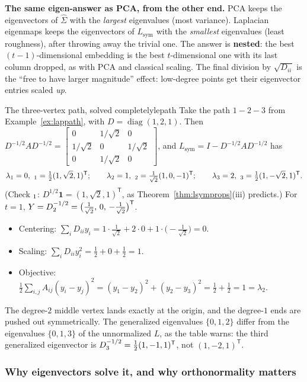 \documentclass[11pt]{article}
\newcommand{\bm}[1]{\symbfit{#1}}
\let\vv\relax\newcommand{\vv}{\bm{v}}
\newcommand{\one}{\symbf{1}}
\newcommand{\Sig}{\widehat{\Sigma}}
\newcommand{\T}{^{\mathsf T}}
\newcommand{\diag}{\operatorname{diag}}
\begin{document}
\begin{intuition}
\textbf{The same eigen-answer as PCA, from the other end.} PCA keeps the eigenvectors of $\Sig$ with the \emph{largest} eigenvalues (most variance). Laplacian eigenmaps keeps the eigenvectors of $L_{\mathrm{sym}}$
with the \emph{smallest} eigenvalues (least roughness), after throwing away the trivial one. The answer is \textbf{nested}: the best
$(t-1)$-dimensional embedding is the best $t$-dimensional one with its last column dropped, as with PCA and classical scaling. The final
division by $\sqrt{D_{ii}}$ is the ``free to have larger magnitude'' effect: low-degree points get their eigenvector entries scaled \emph{up}.
\end{intuition}

\begin{example}{The three-vertex path, solved completely}{lepath}
Take the path $1-2-3$ from Example~\ref{ex:lappath}, with $D=\diag(1,2,1)$. Then $D^{-1/2}AD^{-1/2}=\begin{bmatrix}0&1/\sqrt2&0\\1/\sqrt2&0&1/\sqrt2\\0&1/\sqrt2&0\end{bmatrix}$,
and $L_{\mathrm{sym}}=I-D^{-1/2}AD^{-1/2}$ has
\[
\lambda_1=0,\ \vv_1=\tfrac12(1,\sqrt2,1)\T;\qquad \lambda_2=1,\ \vv_2=\tfrac1{\sqrt2}(1,0,-1)\T;\qquad \lambda_3=2,\ \vv_3=\tfrac12(1,-\sqrt2,1)\T .
\]
(Check $\vv_1$: $D^{1/2}\one=(1,\sqrt2,1)\T$, as Theorem~\ref{thm:lsymprops}(iii) predicts.) For $t=1$, $Y=D^{-1/2}\vv_2=\big(\tfrac1{\sqrt2},\,0,\,-\tfrac1{\sqrt2}\big)\T$.
\begin{itemize}[nosep]
\item Centering: $\sum_iD_{ii}y_i=1\cdot\tfrac1{\sqrt2}+2\cdot0+1\cdot\big(-\tfrac1{\sqrt2}\big)=0$. \checkmark
\item Scaling: $\sum_iD_{ii}y_i^2=\tfrac12+0+\tfrac12=1$. \checkmark
\item Objective: $\tfrac12\sum_{i,j}A_{ij}(y_i-y_j)^2=(y_1-y_2)^2+(y_2-y_3)^2=\tfrac12+\tfrac12=1=\lambda_2$. \checkmark
\end{itemize}
The degree-$2$ middle vertex lands exactly at the origin, and the degree-$1$ ends are pushed out symmetrically. The generalized eigenvalues
$\{0,1,2\}$ differ from the eigenvalues $\{0,1,3\}$ of the unnormalized $L$, as the table warns: the third generalized eigenvector is
$D^{-1/2}\vv_3=\tfrac12(1,-1,1)\T$, not $(1,-2,1)\T$.
\end{example}

\subsubsection*{Why eigenvectors solve it, and why orthonormality matters}
\end{document}
